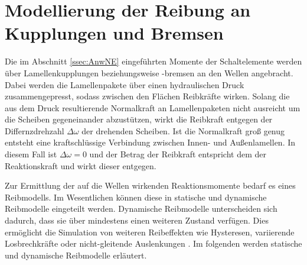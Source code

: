 \section{Modellierung der Reibung an Kupplungen und Bremsen}
Die im Abschnitt \ref{ssec:AnwNE} eingeführten Momente der Schaltelemente werden über Lamellenkupplungen beziehungsweise -bremsen an den Wellen angebracht. Dabei werden die Lamellenpakete über einen hydraulischen Druck zusammengepresst, sodass zwischen den Flächen Reibkräfte wirken. Solang die aus dem Druck resultierende Normalkraft an Lamellenpaketen nicht ausreicht um die Scheiben gegeneinander abzustützen, wirkt die Reibkraft entgegen der Differnzdrehzahl $\Delta \omega$ der drehenden Scheiben. Ist die Normalkraft groß genug entsteht eine kraftschlüssige Verbindung zwischen Innen- und Außenlamellen. In diesem Fall ist $\Delta \omega = 0$ und der Betrag der Reibkraft entspricht dem der Reaktionskraft und wirkt dieser entgegen.   

Zur Ermittlung der auf die Wellen wirkenden Reaktionsmomente bedarf es eines Reibmodells. Im Wesentlichen können diese in statische und dynamische Reibmodelle eingeteilt werden. Dynamische Reibmodelle unterscheiden sich dadurch, dass sie über mindestens einen weiteren Zustand verfügen. Dies ermöglicht die Simulation von weiteren Reibeffekten wie Hysteresen, variierende Losbrechkräfte oder nicht-gleitende Auslenkungen \cite{Schroeder.2015}. Im folgenden werden statische und dynamische Reibmodelle erläutert.

